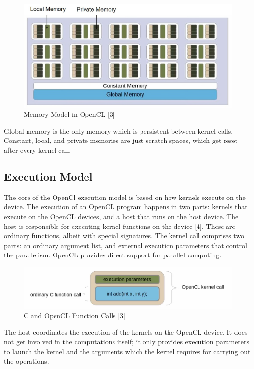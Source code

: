 \begin{itemize}
\begin{figure}[h!]
  \includegraphics[width=\linewidth]{figures/OpenCL_Memory_Model.jpg}
  \caption{Memory Model in OpenCL [3]}
  \label{fig:opencl2}
\end{figure}
\end{itemize}
Global memory is the only memory which is persistent between kernel calls. Constant, local, and private memories are just scratch spaces, which get reset after every kernel call.

 \subsection{Execution Model}
The core of the OpenCl execution model is based on how kernels execute on the device. The execution of an OpenCL program happens in two parts: kernels that execute on the OpenCL devices, and a host that runs on the host device. The host is responsible for executing kernel functions on the device [4]. These are ordinary functions, albeit with special signatures. The kernel call comprises two parts: an ordinary argument list, and external execution parameters that control the parallelism. OpenCL provides direct support for parallel computing. \newline\newline
\begin{figure}[h!]
\includegraphics[width=\linewidth]{figures/C_and_OpenCL_Function_Calls.png}
\caption{C and OpenCL Function Calls [3]}
\label{fig:opencl3}
\end{figure}
The host coordinates the execution of the kernels on the OpenCL device. It does not get involved in the computations itself; it only provides execution parameters to launch the kernel and the arguments which the kernel requires for carrying out the operations. 
